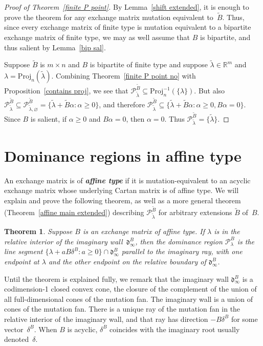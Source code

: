 \documentclass{amsart}
\newtheorem{theorem}[proposition]{Theorem}
\theoremstyle{definition}
\theoremstyle{remark}
\numberwithin{equation}{section}
\newcommand{\newword}[1]{\textbf{\emph{#1}}}
\newcommand{\reals}{\mathbb R}
\newcommand{\set}[1]{{\lbrace #1 \rbrace}}
\newcommand{\0}{{\mathbf{0}}}
\newcommand{\Cone}{\mathrm{Cone}}
\newcommand{\Proj}{\mathrm{Proj}}
\newcommand{\tB}{{\widetilde{B}}}
\renewcommand{\P}{\mathcal{P}}
\renewcommand{\d}{{\mathfrak d}}
\begin{document}
\begin{proof}[Proof of Theorem~\ref{finite P point}]
By Lemma~\ref{shift extended}, it is enough to prove the theorem for any exchange matrix mutation equivalent to~$\tB$.
Thus, since every exchange matrix of finite type is mutation equivalent to a bipartite exchange matrix of finite type, we may as well assume that $B$ is bipartite, and thus salient by Lemma~\ref{bip sal}.

Suppose $\tB$ is $m\times n$ and $B$ is bipartite of finite type and suppose $\tilde\lambda\in\reals^m$ and $\lambda=\Proj_n(\tilde\lambda)$.
Combining Theorem~\ref{finite P point no} with Proposition~\ref{contains proj}, we see that $\P_{\tilde\lambda}^\tB\subseteq\Proj_n^{-1}(\set{\lambda})$.
But also $\P_{\tilde\lambda}^\tB\subseteq\P_{\tilde\lambda,\varnothing}^\tB=\set{\tilde\lambda+\tB\alpha:\alpha\ge0}$, and therefore ${\P_{\tilde\lambda}^\tB\subseteq\set{\tilde\lambda+\tB\alpha:\alpha\ge0,B\alpha=0}}$.
Since $B$ is salient, if $\alpha\ge0$ and $B\alpha=0$, then $\alpha=0$.
Thus $\P_{\tilde\lambda}^\tB=\set{\tilde\lambda}$.
\end{proof}



\section{Dominance regions in affine type}\label{aff sec}
An exchange matrix is of \newword{affine type} if it is mutation-equivalent to an acyclic exchange matrix whose underlying Cartan matrix is of affine type.
We will explain and prove the following theorem, as well as a more general theorem (Theorem~\ref{affine main extended}) describing $\P^\tB_{\tilde\lambda}$ for arbitrary extensions $\tB$ of~$B$.

\begin{theorem}\label{affine main} 
Suppose $B$ is an exchange matrix of affine type.
If $\lambda$ is in the relative interior of the imaginary wall~$\d^B_\infty$, then the dominance region $\P^B_\lambda$ is the line segment ${\set{\lambda+aB\delta^B:a\ge0}\cap\d^B_\infty}$ parallel to the imaginary ray, with one endpoint at $\lambda$ and the other endpoint on the relative boundary of $\d^B_\infty$.
\end{theorem}

Until the theorem is explained fully, we remark that the imaginary wall $\d^B_\infty$ is a codimension-1 closed convex cone, the closure of the complement of the union of all full-dimensional cones of the mutation fan.
The imaginary wall is a union of cones of the mutation fan.
There is a unique ray of the mutation fan in the relative interior of the imaginary wall, and that ray has direction $-B\delta^B$ for some vector~$\delta^B$.
When $B$ is acyclic, $\delta^B$ coincides with the imaginary root usually denoted~$\delta$.
\end{document}
